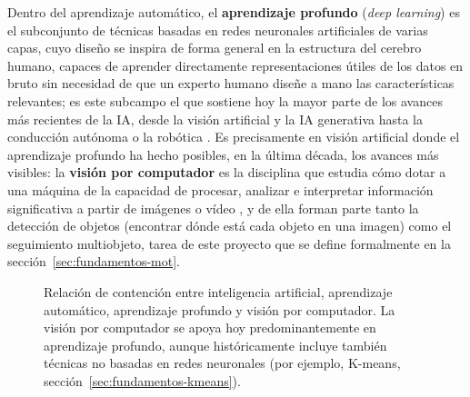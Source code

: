 Dentro del aprendizaje automático, el \textbf{aprendizaje profundo}
(\emph{deep learning}) es el subconjunto de técnicas basadas en redes
neuronales artificiales de varias capas, cuyo diseño se inspira de forma
general en la estructura del cerebro humano, capaces de aprender
directamente representaciones útiles de los datos en bruto sin necesidad de que un experto humano diseñe a
mano las características relevantes; es este subcampo el que sostiene hoy
la mayor parte de los avances más recientes de la IA, desde la visión
artificial y la IA generativa hasta la conducción autónoma o la robótica
\citep{ibm2026dl}. Es precisamente en visión artificial donde el
aprendizaje profundo ha hecho posibles, en la última década, los avances
más visibles: la \textbf{visión por computador} es la disciplina que
estudia cómo dotar a una máquina de la capacidad de procesar, analizar e
interpretar información significativa a partir de imágenes o vídeo
\citep{ibm2026cv}, y de ella forman parte tanto la detección de objetos
(encontrar dónde está cada objeto en una imagen) como el seguimiento
multiobjeto, tarea de este proyecto que se define formalmente en la
sección~\ref{sec:fundamentos-mot}.

\begin{figure}[htp]
\centering
{}
\caption{Relación de contención entre inteligencia artificial, aprendizaje
automático, aprendizaje profundo y visión por computador. La visión por
computador se apoya hoy predominantemente en aprendizaje profundo, aunque
históricamente incluye también técnicas no basadas en redes neuronales
(por ejemplo, K-means, sección~\ref{sec:fundamentos-kmeans}).}
\label{fig:jerarquia-ia}
\end{figure}

